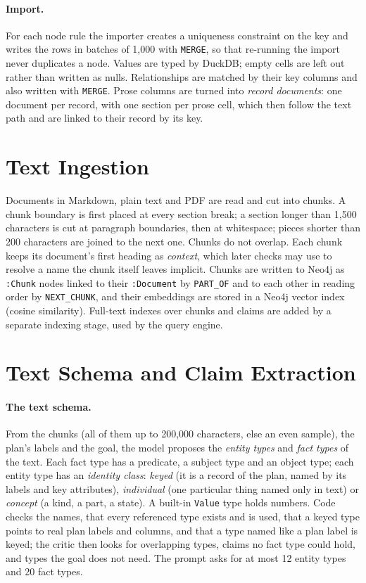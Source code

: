 \paragraph{Import.} For each node rule the importer creates a uniqueness constraint on the key and writes the
rows in batches of 1{,}000 with \texttt{MERGE}, so that re-running the import never duplicates a node. Values are
typed by DuckDB; empty cells are left out rather than written as nulls. Relationships are matched by their key
columns and also written with \texttt{MERGE}. Prose columns are turned into \emph{record documents}: one document
per record, with one section per prose cell, which then follow the text path and are linked to their record by
its key.

\section{Text Ingestion}\label{sec:ch04-text}

Documents in Markdown, plain text and PDF are read and cut into chunks. A chunk boundary is first placed at every
section break; a section longer than 1{,}500 characters is cut at paragraph boundaries, then at whitespace; pieces
shorter than 200 characters are joined to the next one. Chunks do not overlap. Each chunk keeps its document's
first heading as \emph{context}, which later checks may use to resolve a name the chunk itself leaves implicit.
Chunks are written to Neo4j as \texttt{:Chunk} nodes linked to their \texttt{:Document} by \texttt{PART\_OF} and
to each other in reading order by \texttt{NEXT\_CHUNK}, and their embeddings are stored in a Neo4j vector index
(cosine similarity). Full-text indexes over chunks and claims are added by a separate indexing stage, used by
the query engine.

\section{Text Schema and Claim Extraction}\label{sec:ch04-extraction}

\paragraph{The text schema.} From the chunks (all of them up to 200{,}000 characters, else an even sample), the
plan's labels and the goal, the model proposes the \emph{entity types} and \emph{fact types} of the text. Each fact
type has a predicate, a subject type and an object type; each entity type has an \emph{identity class}:
\emph{keyed} (it is a record of the plan, named by its labels and key attributes), \emph{individual} (one
particular thing named only in text) or \emph{concept} (a kind, a part, a state). A built-in \texttt{Value} type
holds numbers. Code checks the names, that every referenced type exists and is used, that a keyed type points to
real plan labels and columns, and that a type named like a plan label is keyed; the critic then looks for
overlapping types, claims no fact type could hold, and types the goal does not need. The prompt asks for at most
12 entity types and 20 fact types.

